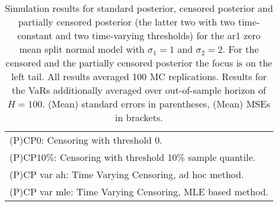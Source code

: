 {\begin{sidewaystable}
\begin{tabular}{cc cc cccc cccc}
\multicolumn{12}{l}{\footnotesize{(P)CP0: Censoring with threshold 0.}} \\ 
\multicolumn{12}{l}{\footnotesize{(P)CP10\%: Censoring with threshold 10\% sample quantile.}}  \\ 
\multicolumn{12}{l}{\footnotesize{(P)CP var ah: Time Varying Censoring, ad hoc method.}} \\ 
\multicolumn{12}{l}{\footnotesize{(P)CP var mle: Time Varying Censoring, MLE based method.}}  \\ 
\end{tabular}
 \caption{Simulation results for standard posterior, censored posterior and partially censored posterior (the latter two with two time-constant and two time-varying thresholds) for the ar1 zero mean split normal model with $\sigma_{1} = 1$ and $\sigma_{2} = 2$. For the censored and the partially censored posterior the focus is on the left tail. All results averaged 100 MC replications. Results for the VaRs additionally averaged over out-of-sample horizon of $H=100$. (Mean) standard errors in parentheses, (Mean) MSEs in brackets.} 
\label{tab:ar1_pcp_var}  
\end{sidewaystable}
}
